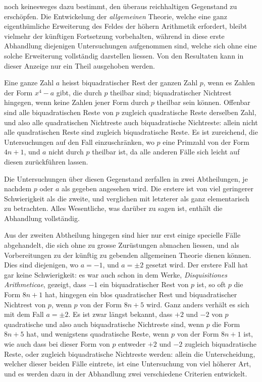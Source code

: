 %
noch keinesweges dazu bestimmt, den überaus reichhaltigen Gegenstand zu erschöpfen. Die Entwickelung der \emph{allgemeinen} Theorie, welche eine ganz eigenthümliche Erweiterung des Feldes der höhern Arithmetik erfordert, bleibt vielmehr der künftigen Fortsetzung vorbehalten, während in diese erste Abhandlung diejenigen Untersuchungen aufgenommen sind, welche sich ohne eine solche Erweiterung vollständig darstellen liessen. Von den Resultaten kann in dieser Anzeige nur ein Theil ausgehoben werden.

Eine ganze Zahl $a$ heisst biquadratischer Rest der ganzen Zahl $p$, wenn es Zahlen der Form $x^4-a$ gibt, die durch $p$ theilbar sind; biquadratischer Nichtrest hingegen, wenn keine Zahlen jener Form durch $p$ theilbar sein können. Offenbar sind alle biquadratischen Reste von $p$ zugleich quadratische Reste derselben Zahl, und also alle quadratischen Nichtreste auch biquadratische Nichtreste: allein nicht alle quadratischen Reste sind zugleich biquadratische Reste. Es ist zureichend, die Untersuchungen auf den Fall einzuschränken, wo $p$ eine Primzahl von der Form $4n+1$, und $a$ nicht durch $p$ theilbar ist, da alle anderen Fälle sich leicht auf diesen zurückführen lassen.

Die Untersuchungen über diesen Gegenstand zerfallen in zwei Abtheilungen, je nachdem $p$ oder $a$ als gegeben angesehen wird. Die erstere ist von viel geringerer Schwierigkeit als die zweite, und verglichen mit letzterer als ganz elementarisch zu betrachten. Alles Wesentliche, was darüber zu sagen ist, enthält die Abhandlung vollständig.

Aus der zweiten Abtheilung hingegen sind hier nur erst einige specielle Fälle abgehandelt, die sich ohne zu grosse Zurüstungen abmachen liessen, und als Vorbereitungen zu der künftig zu gebenden allgemeinen Theorie dienen können. Dies sind diejenigen, wo $a=-1$, und $a=\pm2$ gesetzt wird. Der erstere Fall hat gar keine Schwierigkeit: es war auch schon in dem Werke, \emph{Disquisitiones Arithmeticae}, gezeigt, dass $-1$ ein biquadratischer Rest von $p$ ist, so oft $p$ die Form $8n+1$ hat, hingegen ein blos quadratischer Rest und biquadratischer Nichtrest von $p$, wenn $p$ von der Form $8n+5$ wird. Ganz anders verhält es sich mit dem Fall $a=\pm2$. Es ist zwar längst bekannt, dass $+2$ und $-2$ von $p$ quadratische und also auch biquadratische Nichtreste sind, wenn $p$ die Form $8n+5$ hat, und wenigstens quadratische Reste, wenn $p$ von der Form $8n+1$ ist, wie auch dass bei dieser Form von $p$ entweder $+2$ und $-2$ zugleich biquadratische Reste, oder zugleich biquadratische Nichtreste werden: 
%
allein die Unterscheidung, welcher dieser beiden Fälle eintrete, ist eine Untersuchung von viel höherer Art, und es werden dazu in der Abhandlung zwei verschiedene Criterien entwickelt.

